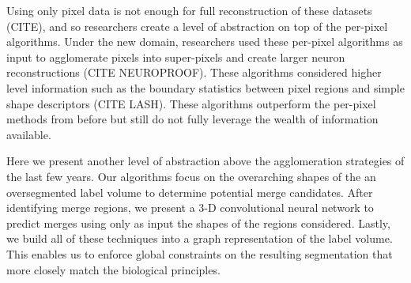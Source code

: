 Using only pixel data is not enough for full reconstruction of these datasets (CITE), and so researchers create a level of abstraction on top of the per-pixel algorithms. Under the new domain, researchers used these per-pixel algorithms as input to agglomerate pixels into super-pixels and create larger neuron reconstructions \cite{nunez2014graph} (CITE NEUROPROOF). These algorithms considered higher level information such as the boundary statistics between pixel regions and simple shape descriptors (CITE LASH).  These algorithms outperform the per-pixel methods from before but still do not fully leverage the wealth of information available.

Here we present another level of abstraction above the agglomeration strategies of the last few years. Our algorithms focus on the overarching shapes of the an oversegmented label volume to determine potential merge candidates. After identifying merge regions, we present a 3-D convolutional neural network to predict merges using only as input the shapes of the regions considered. Lastly, we build all of these techniques into a graph representation of the label volume. This enables us to enforce global constraints on the resulting segmentation that more closely match the biological principles. 